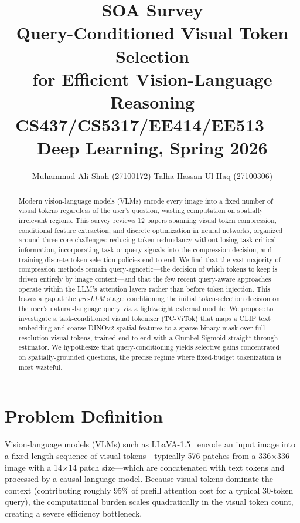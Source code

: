 \documentclass[11pt,twocolumn]{article}
\title{
    \vspace{-1cm}
    {\large \textbf{SOA Survey}} \\[0.3em]
    {\LARGE Query-Conditioned Visual Token Selection\\for Efficient Vision-Language Reasoning} \\[0.5em]
    {\normalsize CS437/CS5317/EE414/EE513 --- Deep Learning, Spring 2026}
}
\author{
    Muhammad Ali Shah (27100172) \quad Talha Hassan Ul Haq (27100306)
}
\date{}
\begin{document}
\maketitle
\thispagestyle{fancy}

\begin{abstract}
Modern vision-language models (VLMs) encode every image into a fixed number of visual tokens regardless of the user's question, wasting computation on spatially irrelevant regions. This survey reviews 12 papers spanning visual token compression, conditional feature extraction, and discrete optimization in neural networks, organized around three core challenges: reducing token redundancy without losing task-critical information, incorporating task or query signals into the compression decision, and training discrete token-selection policies end-to-end. We find that the vast majority of compression methods remain query-agnostic---the decision of which tokens to keep is driven entirely by image content---and that the few recent query-aware approaches operate within the LLM's attention layers rather than before token injection. This leaves a gap at the \emph{pre-LLM} stage: conditioning the initial token-selection decision on the user's natural-language query via a lightweight external module. We propose to investigate a task-conditioned visual tokenizer (TC-ViTok) that maps a CLIP text embedding and coarse DINOv2 spatial features to a sparse binary mask over full-resolution visual tokens, trained end-to-end with a Gumbel-Sigmoid straight-through estimator. We hypothesize that query-conditioning yields selective gains concentrated on spatially-grounded questions, the precise regime where fixed-budget tokenization is most wasteful.
\end{abstract}

\section{Problem Definition}
\label{sec:problem}

Vision-language models (VLMs) such as LLaVA-1.5~\cite{liu2024llava} encode an input image into a fixed-length sequence of visual tokens---typically 576 patches from a 336$\times$336 image with a 14$\times$14 patch size---which are concatenated with text tokens and processed by a causal language model. Because visual tokens dominate the context (contributing roughly 95\% of prefill attention cost for a typical 30-token query), the computational burden scales quadratically in the visual token count, creating a severe efficiency bottleneck.
\end{document}
